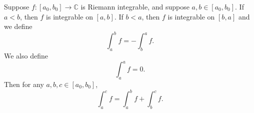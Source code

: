 Suppose $f: [a_0, b_0] \to \mathbb{C}$ is Riemann integrable, and suppose $a, b \in [a_0, b_0]$. If $a < b$, then $f$ is integrable on $[a, b]$. If $b < a$, then $f$ is integrable on $[b, a]$ and we define
$$\int_a^b f = -\int_b^a f.$$
We also define
$$\int_a^a f = 0.$$
Then for any $a, b, c \in [a_0, b_0]$,
$$\int_a^c f = \int_a^b f + \int_b^c f.$$
